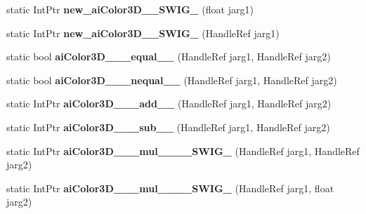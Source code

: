 \begin{DoxyCompactItemize}
\item 
\hypertarget{class_assimp_p_i_n_v_o_k_e_aff35b8c97ce557ca696ba6b494b85ae9}{static Int\+Ptr {\bfseries new\+\_\+ai\+Color3\+D\+\_\+\+\_\+\+S\+W\+I\+G\+\_} (float jarg1)}\label{class_assimp_p_i_n_v_o_k_e_aff35b8c97ce557ca696ba6b494b85ae9}

\item 
\hypertarget{class_assimp_p_i_n_v_o_k_e_ae55e0df67b343d6f49e05ef3031f7c95}{static Int\+Ptr {\bfseries new\+\_\+ai\+Color3\+D\+\_\+\+\_\+\+S\+W\+I\+G\+\_} (Handle\+Ref jarg1)}\label{class_assimp_p_i_n_v_o_k_e_ae55e0df67b343d6f49e05ef3031f7c95}

\item 
\hypertarget{class_assimp_p_i_n_v_o_k_e_a5679e10b798bdde68d7f36f2b7dfe98d}{static bool {\bfseries ai\+Color3\+D\+\_\+\+\_\+\+\_\+equal\+\_\+\+\_\+} (Handle\+Ref jarg1, Handle\+Ref jarg2)}\label{class_assimp_p_i_n_v_o_k_e_a5679e10b798bdde68d7f36f2b7dfe98d}

\item 
\hypertarget{class_assimp_p_i_n_v_o_k_e_ac72dfe98e64dc4df290d5a4c1279369f}{static bool {\bfseries ai\+Color3\+D\+\_\+\+\_\+\+\_\+nequal\+\_\+\+\_\+} (Handle\+Ref jarg1, Handle\+Ref jarg2)}\label{class_assimp_p_i_n_v_o_k_e_ac72dfe98e64dc4df290d5a4c1279369f}

\item 
\hypertarget{class_assimp_p_i_n_v_o_k_e_af30c83d44020a0ab55db65aef66466e5}{static Int\+Ptr {\bfseries ai\+Color3\+D\+\_\+\+\_\+\+\_\+add\+\_\+\+\_\+} (Handle\+Ref jarg1, Handle\+Ref jarg2)}\label{class_assimp_p_i_n_v_o_k_e_af30c83d44020a0ab55db65aef66466e5}

\item 
\hypertarget{class_assimp_p_i_n_v_o_k_e_a711628bd221f85c85f461a102469b4e2}{static Int\+Ptr {\bfseries ai\+Color3\+D\+\_\+\+\_\+\+\_\+sub\+\_\+\+\_\+} (Handle\+Ref jarg1, Handle\+Ref jarg2)}\label{class_assimp_p_i_n_v_o_k_e_a711628bd221f85c85f461a102469b4e2}

\item 
\hypertarget{class_assimp_p_i_n_v_o_k_e_ae4b5c2af0dd85fc2b8f6d7424546dc2e}{static Int\+Ptr {\bfseries ai\+Color3\+D\+\_\+\+\_\+\+\_\+mul\+\_\+\+\_\+\+\_\+\+\_\+\+S\+W\+I\+G\+\_} (Handle\+Ref jarg1, Handle\+Ref jarg2)}\label{class_assimp_p_i_n_v_o_k_e_ae4b5c2af0dd85fc2b8f6d7424546dc2e}

\item 
\hypertarget{class_assimp_p_i_n_v_o_k_e_a08a1bd2ea75df3432107933a0fc801b4}{static Int\+Ptr {\bfseries ai\+Color3\+D\+\_\+\+\_\+\+\_\+mul\+\_\+\+\_\+\+\_\+\+\_\+\+S\+W\+I\+G\+\_} (Handle\+Ref jarg1, float jarg2)}\label{class_assimp_p_i_n_v_o_k_e_a08a1bd2ea75df3432107933a0fc801b4}


\end{DoxyCompactItemize}
